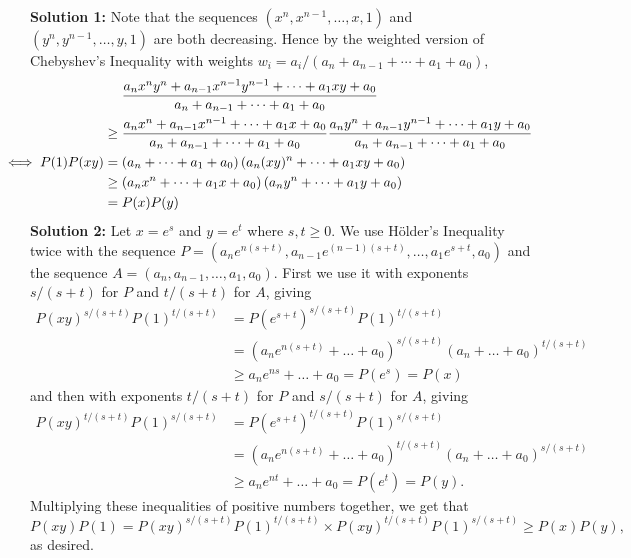 \documentclass[a4paper,12pt]{article}
\begin{document}
\begin{enumerate}
	\textbf{Solution 1:} Note that the sequences $(x^n, x^{n-1}, \dotsc, x, 1)$ and $(y^n, y^{n-1}, \dotsc, y, 1)$ are both decreasing. Hence by the weighted version of Chebyshev's Inequality with weights $w_i = a_i/(a_n+a_{n-1}+\dotsb+a_1+a_0)$,
	\begin{align*}
		&\mspace{24mu} \frac{a_n x^ny^n +a_{n-1}x^{n-1}y^{n-1} +\dotsb +a_1 xy +a_0}{a_n+a_{n-1} +\dotsb +a_1 +a_0} \\ &\geq \frac{a_n x^n +a_{n-1}x^{n-1} +\dotsb +a_1 x +a_0}{a_n+a_{n-1} +\dotsb +a_1 +a_0} \frac{a_n y^n +a_{n-1}y^{n-1} +\dotsb +a_1 y +a_0}{a_n+a_{n-1} +\dotsb +a_1 +a_0} \\
		\mspace{-36mu} \iff P(1)P(xy) &= \left(a_n +\dotsb +a_1 +a_0\right) \left(a_n(xy)^n +\dotsb +a_1 xy +a_0\right) \\ &\geq \left(a_nx^n +\dotsb +a_1 x +a_0\right) \left(a_ny^n +\dotsb +a_1 y +a_0\right) \\ &= P(x)P(y)
	\end{align*}
	\textbf{Solution 2:} Let $x = e^s$ and $y = e^t$ where $s,t \geq 0$. We use H\"older's Inequality twice with the sequence $P = (a_n e^{n(s+t)}, a_{n-1} e^{(n-1)(s+t)}, \dotsc, a_1 e^{s+t}, a_0)$ and the sequence $A = (a_n, a_{n-1}, \dotsc, a_1, a_0)$. First we use it with exponents $s/(s+t)$ for $P$ and $t/(s+t)$ for $A$, giving \begin{align*} P(xy)^{s/(s+t)} P(1)^{t/(s+t)} &= P\!\left(e^{s+t}\right)^{s/(s+t)} P(1)^{t/(s+t)} \\ &= \left(a_n e^{n(s+t)} +\dotsc +a_0\right)^{s/(s+t)} \left(a_n +\dotsc +a_0\right)^{t/(s+t)} \\ &\geq a_n e^{ns} +\dotsc +a_0 = P(e^s) = P(x)\end{align*} and then with exponents $t/(s+t)$ for $P$ and $s/(s+t)$ for $A$, giving \begin{align*} P(xy)^{t/(s+t)} P(1)^{s/(s+t)} &= P\!\left(e^{s+t}\right)^{t/(s+t)} P(1)^{s/(s+t)} \\ &= \left(a_n e^{n(s+t)} +\dotsc +a_0\right)^{t/(s+t)} \left(a_n +\dotsc +a_0\right)^{s/(s+t)} \\ &\geq a_n e^{nt} +\dotsc +a_0 = P(e^t) = P(y).\end{align*}
	Multiplying these inequalities of positive numbers together, we get that \[P(xy)P(1) = P(xy)^{s/(s+t)} P(1)^{t/(s+t)} \times P(xy)^{t/(s+t)} P(1)^{s/(s+t)} \geq P(x) P(y),\] as desired.

\end{enumerate}
\end{document}

